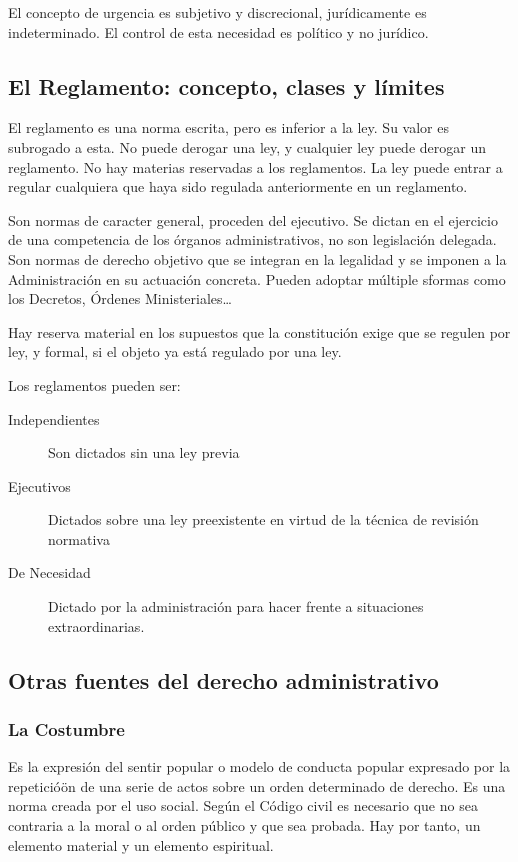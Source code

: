         El concepto de urgencia es subjetivo y discrecional, jurídicamente es indeterminado. El control de esta necesidad es político y no jurídico.

\subsection{El Reglamento: concepto, clases y límites} %
    El reglamento es una norma escrita, pero es inferior a la ley. Su valor es subrogado a esta. No puede derogar una ley, y cualquier ley puede derogar un reglamento. No hay materias reservadas a los reglamentos. La ley puede entrar a regular cualquiera que haya sido regulada anteriormente en un reglamento.

    Son normas de caracter general, proceden del ejecutivo. Se dictan en el ejercicio de una competencia de los órganos administrativos, no son legislación delegada. Son normas de derecho objetivo que se integran en la legalidad y se imponen a la Administración en su actuación concreta. Pueden adoptar múltiple sformas como los Decretos, Órdenes Ministeriales\dots 

    Hay reserva material en los supuestos que la constitución exige que se regulen por ley, y formal, si el objeto ya está regulado por una ley.

    Los reglamentos pueden ser:
    \begin{description}
        \item[Independientes] Son dictados sin una ley previa
        \item[Ejecutivos] Dictados sobre una ley preexistente en virtud de la técnica de revisión normativa
        \item[De Necesidad] Dictado por la administración para hacer frente a situaciones extraordinarias.
    \end{description}
\subsection{Otras fuentes del derecho administrativo} %
    \subsubsection{La Costumbre}
        Es la expresión del sentir popular o modelo de conducta popular expresado por la repeticióön de una serie de actos sobre un orden determinado de derecho. Es una norma creada por el uso social. Según el Código civil es necesario que no sea contraria a la moral o al orden público y que sea probada. Hay por tanto, un elemento material y un elemento espiritual.

